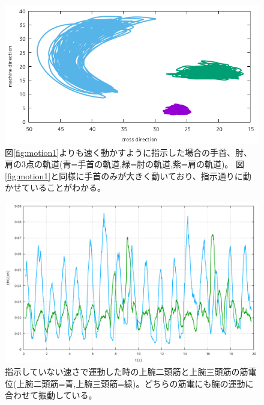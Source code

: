 \documentclass{jsarticle}
\begin{document}
\begin{figure}[h]
  \begin{center}
    \includegraphics[clip,width=150mm]{Graph_3.png}
    \caption{図\ref{fig:motion1}よりも速く動かすように指示した場合の手首、肘、肩の3点の軌道(青=手首の軌道,緑=肘の軌道,紫=肩の軌道)。 図\ref{fig:motion1}と同様に手首のみが大きく動いており、指示通りに動かせていることがわかる。\label{fig:motion2}}
  \end{center}
\end{figure}

\begin{figure}[h]
  \begin{center}
    \includegraphics[clip,width=120mm]{Graph_4.png}
    \caption{指示していない速さで運動した時の上腕二頭筋と上腕三頭筋の筋電位(上腕二頭筋=青,上腕三頭筋=緑)。どちらの筋電にも腕の運動に合わせて振動している。 \label{fig:EMG1}}
  \end{center}
\end{figure}
\end{document}
